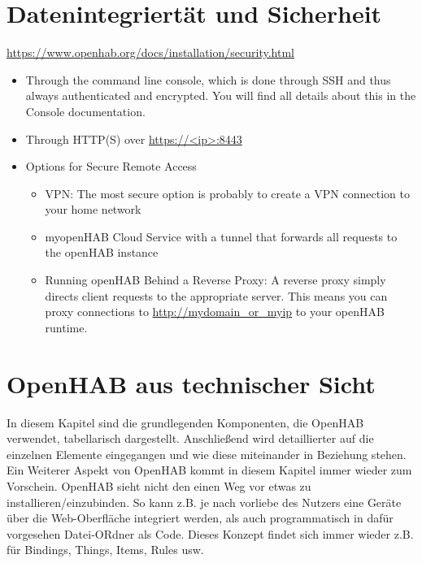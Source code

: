 \section{Datenintegriertät und Sicherheit}
\url{https://www.openhab.org/docs/installation/security.html}
\begin{itemize}
	\item Through the command line console, which is done through SSH and thus always authenticated and encrypted. You will find all details about this in the Console documentation.
	\item Through HTTP(S) over \url{https://<ip>:8443}
	\item Options for Secure Remote Access
	\begin{itemize}
		\item VPN: The most secure option is probably to create a VPN connection to your home network
		\item myopenHAB Cloud Service with a tunnel that forwards all requests to the openHAB instance
		\item Running openHAB Behind a Reverse Proxy: A reverse proxy simply directs client requests to the appropriate server. This means you can proxy connections to \url{http://mydomain_or_myip} to your openHAB runtime.
	\end{itemize}
\end{itemize}



\section{OpenHAB aus technischer Sicht}
In diesem Kapitel sind die grundlegenden Komponenten, die OpenHAB verwendet, tabellarisch dargestellt. Anschließend wird detaillierter auf die einzelnen Elemente eingegangen und wie diese miteinander in Beziehung stehen. Ein Weiterer Aspekt von OpenHAB kommt in diesem Kapitel immer wieder zum Vorschein. OpenHAB sieht nicht den einen Weg vor etwas zu installieren/einzubinden. So kann z.B. je nach vorliebe des Nutzers eine Geräte über die Web-Oberfläche integriert werden, als auch programmatisch in dafür vorgesehen Datei-ORdner als Code. Dieses Konzept findet sich immer wieder z.B. für Bindings, Things, Items, Rules usw.

